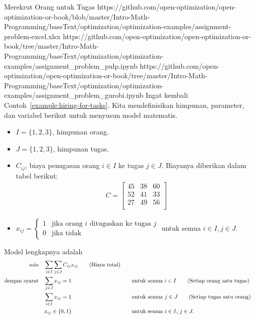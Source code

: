 \begin{examplewithallcode}{Merekrut Orang untuk Tugas}
{https://github.com/open-optimization/open-optimization-or-book/blob/master/Intro-Math-Programming/baseText/optimization/optimization-examples/assignment-problem-excel.xlsx}
{https://github.com/open-optimization/open-optimization-or-book/tree/master/Intro-Math-Programming/baseText/optimization/optimization-examples/assignment_problem_pulp.ipynb}
{https://github.com/open-optimization/open-optimization-or-book/tree/master/Intro-Math-Programming/baseText/optimization/optimization-examples/assignment_problem_gurobi.ipynb}
Ingat kembali Contoh~\ref{example:hiring-for-tasks}.  
Kita mendefinisikan himpunan, parameter, dan variabel berikut untuk menyusun model matematis.

\begin{itemize}
    \item $I = \{1, 2, 3\}$, himpunan orang.
    \item $J = \{1, 2, 3\}$, himpunan tugas.
\end{itemize}

\begin{itemize}
    \item $C_{ij}$, biaya penugasan orang $i \in I$ ke tugas $j \in J$. Biayanya diberikan dalam tabel berikut:
    \begin{align*}
        C = \begin{bmatrix}
            45 & 38 & 60 \\
            52 & 41 & 33 \\
            27 & 49 & 56 \\
        \end{bmatrix}
    \end{align*}
\end{itemize}

\begin{itemize}
    \item $x_{ij} = 
    \begin{cases} 
    1 & \text{jika orang } i \text{ ditugaskan ke tugas } j \\
    0 & \text{jika tidak}
    \end{cases}$ untuk semua $i \in I, j \in J$.
\end{itemize}


Model lengkapnya adalah
\begin{align*}
\min \quad & \sum_{i \in I} \sum_{j \in J} C_{ij} x_{ij}   \tag{Biaya total} \\
\mbox{dengan syarat}\quad        & \sum_{j \in J} x_{ij} = 1 &&\quad \mbox{untuk semua } i \in I   \tag{Setiap orang satu tugas} \\
             & \sum_{i \in I} x_{ij} = 1 &&\quad \mbox{untuk semua } j \in J   \tag{Setiap tugas satu orang} \\
             & x_{ij} \in \{0,1\} &&\quad \mbox{untuk semua } i \in I,\, j \in J.
\end{align*}


\end{examplewithallcode}
